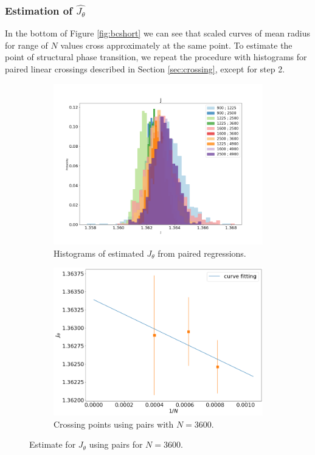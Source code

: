 \subsubsection{ Estimation of $\hat{J_{\theta}}$} \label{sec:2DJthetatransition}

In the bottom of Figure \ref{fig:bcshort} we can see that scaled curves of mean radius for range of $N$ values cross approximately at the same point. To estimate the point of structural phase transition, we repeat the procedure with histograms for paired linear crossings described  in Section \ref{sec:crossing}, except for step 2. 
 
   \begin{figure}
 	\centering
 	\captionsetup{justification=centering}
 	\begin{subfigure}[b]{0.45\textwidth}
 		\includegraphics[width=\textwidth]{Images/radius_hist_cov.png}
 		\caption{ Histograms of estimated $J_{\theta}$ from paired regressions.  } 
 		\label{fig:Jthetahistogram}
 	\end{subfigure}
 	\begin{subfigure}[b]{0.45\textwidth}
 		\includegraphics[width=\textwidth]{Images/criticalr2_4900.png}
 		\caption{  Crossing points using pairs with $N= 3600$. }
 		\label{fig:JthetaLinear}
 	\end{subfigure}
 	\caption{ Estimate for $J_{\theta}$ using pairs for $N=3600$.  }
 	\label{fig:JTheta}
 \end{figure} 
